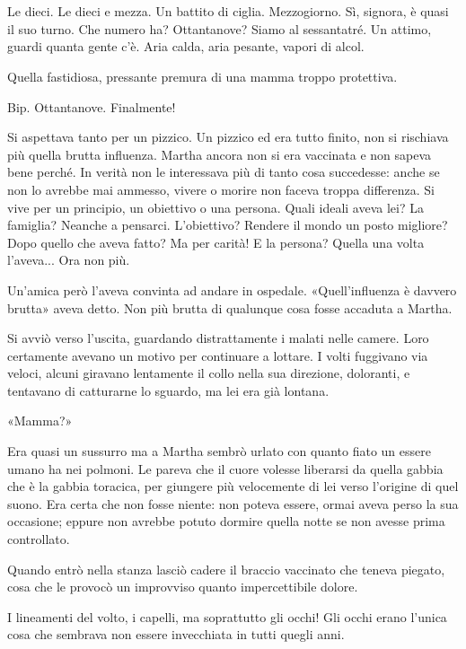 \chapter{}
\label{ch:7}

Le dieci. Le dieci e mezza. Un battito di ciglia. Mezzogiorno. Sì, signora, è quasi il suo turno.
Che numero ha? Ottantanove? Siamo al sessantatré. Un attimo, guardi quanta gente c’è. Aria calda,
aria pesante, vapori di alcol.

Quella fastidiosa, pressante premura di una mamma troppo protettiva.

Bip. Ottantanove. Finalmente!

Si aspettava tanto per un pizzico. Un pizzico ed era tutto finito, non si rischiava più quella
brutta influenza. Martha ancora non si era vaccinata e non sapeva bene perché. In verità non le
interessava più di tanto cosa succedesse: anche se non lo avrebbe mai ammesso, vivere o morire non
faceva troppa differenza. Si vive per un principio, un obiettivo o una persona. Quali ideali aveva
lei? La famiglia? Neanche a pensarci. L’obiettivo? Rendere il mondo un posto migliore? Dopo quello
che aveva fatto? Ma per carità! E la persona? Quella una volta l’aveva... Ora non più.

Un’amica però l’aveva convinta ad andare in ospedale. «Quell’influenza è davvero brutta» aveva
detto. Non più brutta di qualunque cosa fosse accaduta a Martha.

Si avviò verso l’uscita, guardando distrattamente i malati nelle camere. Loro certamente avevano un
motivo per continuare a lottare. I volti fuggivano via veloci, alcuni giravano lentamente il collo
nella sua direzione, doloranti, e tentavano di catturarne lo sguardo, ma lei era già lontana.

«Mamma?»

Era quasi un sussurro ma a Martha sembrò urlato con quanto fiato un essere umano ha nei polmoni. Le
pareva che il cuore volesse liberarsi da quella gabbia che è la gabbia toracica, per giungere più
velocemente di lei verso l’origine di quel suono. Era certa che non fosse niente: non poteva essere,
ormai aveva perso la sua occasione; eppure non avrebbe potuto dormire quella notte se non avesse
prima controllato.

Quando entrò nella stanza lasciò cadere il braccio vaccinato che teneva piegato, cosa che le provocò
un improvviso quanto impercettibile dolore.

I lineamenti del volto, i capelli, ma soprattutto gli occhi! Gli occhi erano l’unica cosa che
sembrava non essere invecchiata in tutti quegli anni.

